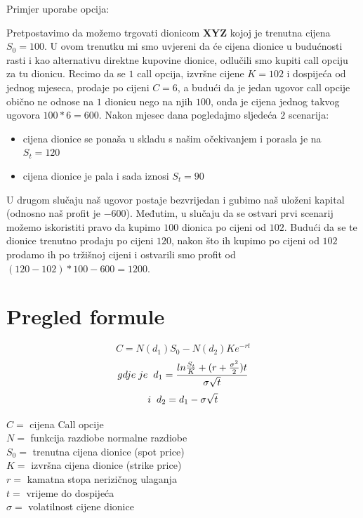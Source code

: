 \documentclass[times, utf8, seminar]{fer}
\begin{document}
\noindent Primjer uporabe opcija:

Pretpostavimo da možemo trgovati dionicom \textbf{XYZ} kojoj je trenutna cijena $S_0 = 100$. U ovom trenutku mi smo uvjereni da će cijena dionice u budućnosti rasti i kao alternativu direktne kupovine dionice, odlučili smo kupiti call opciju za tu dionicu. Recimo da se $1$ call opcija, izvršne cijene $K = 102$ i dospijeća od jednog mjeseca, prodaje po cijeni $C = 6$, a budući da je jedan ugovor call opcije obično ne odnose na $1$ dionicu nego na njih $100$, onda je cijena jednog takvog ugovora $100 * 6 = 600$. Nakon mjesec dana pogledajmo sljedeća $2$ scenarija:
\begin{itemize}
    \item[\textbullet] cijena dionice se ponaša u skladu s našim očekivanjem i porasla je na $S_t = 120$
    \item[\textbullet] cijena dionice je pala i sada iznosi $S_t = 90$
\end{itemize}
\noindent U drugom slučaju naš ugovor postaje bezvrijedan i gubimo naš uloženi kapital (odnosno naš profit je $-600$). Međutim, u slučaju da se ostvari prvi scenarij možemo iskoristiti pravo da kupimo $100$ dionica po cijeni od $102$. Budući da se te dionice trenutno prodaju po cijeni $120$, nakon što ih kupimo po cijeni od $102$ prodamo ih po tržišnoj cijeni i ostvarili smo profit od $(120 - 102) * 100 - 600 = 1200$.

\section{Pregled formule}

\[ C = N(d_1)S_0 - N(d_2)Ke^{-rt} \]
\[ gdje \hspace{0.1cm} je \hspace{0.2cm} d_1 = \frac{ln\frac{S_t}{K} + (r+\frac{\sigma^2}{2})t}{\sigma\sqrt{t}} \]
\[i \hspace{0.2cm} d_2 = d_1 - \sigma \sqrt{t}\]

\noindent $C =$ cijena Call opcije \\
$N =$ funkcija razdiobe normalne razdiobe\\
$S_0 =$ trenutna cijena dionice (spot price)\\
$K =$ izvršna cijena dionice (strike price)\\
$r =$ kamatna stopa nerizičnog ulaganja\\
$t =$ vrijeme do dospijeća\\
$\sigma =$ volatilnost cijene dionice \\
\end{document}
